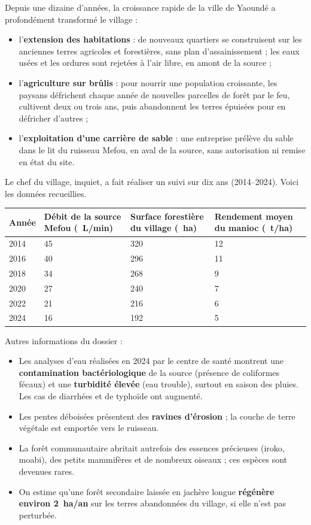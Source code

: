 \documentclass[11pt]{article}
\begin{document}
Depuis une dizaine d'années, la croissance rapide de la ville de Yaoundé a profondément transformé le village :

\begin{itemize}
\item l'\textbf{extension des habitations} : de nouveaux quartiers se construisent sur les anciennes terres agricoles et forestières, sans plan d'assainissement ; les eaux usées et les ordures sont rejetées à l'air libre, en amont de la source ;
\item l'\textbf{agriculture sur brûlis} : pour nourrir une population croissante, les paysans défrichent chaque année de nouvelles parcelles de forêt par le feu, cultivent deux ou trois ans, puis abandonnent les terres épuisées pour en défricher d'autres ;
\item l'\textbf{exploitation d'une carrière de sable} : une entreprise prélève du sable dans le lit du ruisseau Mefou, en aval de la source, sans autorisation ni remise en état du site.
\end{itemize}

Le chef du village, inquiet, a fait réaliser un suivi sur dix ans (2014--2024). Voici les données recueillies.

\begin{center}
\begin{tabularx}{\linewidth}{|l|X|X|X|}
\hline
\rowcolor{popblue!40} \textbf{Année} & \textbf{Débit de la source Mefou (\SI{}{L/min})} & \textbf{Surface forestière du village (\SI{}{ha})} & \textbf{Rendement moyen du manioc (\SI{}{t/ha})} \\
\hline
2014 & 45 & 320 & 12 \\
2016 & 40 & 296 & 11 \\
2018 & 34 & 268 & 9 \\
2020 & 27 & 240 & 7 \\
2022 & 21 & 216 & 6 \\
2024 & 16 & 192 & 5 \\
\hline
\end{tabularx}
\end{center}

Autres informations du dossier :

\begin{itemize}
\item Les analyses d'eau réalisées en 2024 par le centre de santé montrent une \textbf{contamination bactériologique} de la source (présence de coliformes fécaux) et une \textbf{turbidité élevée} (eau trouble), surtout en saison des pluies. Les cas de diarrhées et de typhoïde ont augmenté.
\item Les pentes déboisées présentent des \textbf{ravines d'érosion} ; la couche de terre végétale est emportée vers le ruisseau.
\item La forêt communautaire abritait autrefois des essences précieuses (iroko, moabi), des petits mammifères et de nombreux oiseaux ; ces espèces sont devenues rares.
\item On estime qu'une forêt secondaire laissée en jachère longue \textbf{régénère environ \SI{2}{ha/an}} sur les terres abandonnées du village, si elle n'est pas perturbée.
\end{itemize}
\end{document}
